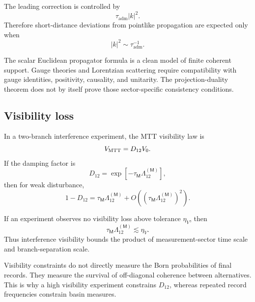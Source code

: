 \documentclass[11pt]{article}
\newcommand{\ta}{\tau_{\mathrm{adm}}}
\newcommand{\Meas}{\mathsf M}
\begin{document}
The leading correction is controlled by
\begin{equation}
  \ta |k|^2.
\end{equation}
Therefore short-distance deviations from pointlike propagation are expected only when
\begin{equation}
  |k|^2\sim \ta^{-1}.
\end{equation}

\begin{remark}
\label{rem:gauge-lorentzian-caution-phen}
The scalar Euclidean propagator formula is a clean model of finite coherent support. Gauge
theories and Lorentzian scattering require compatibility with gauge identities, positivity,
causality, and unitarity. The projection-duality theorem does not by itself prove those
sector-specific consistency conditions.
\end{remark}

\subsection{Visibility loss}
\label{subsec:visibility-loss-phen}

In a two-branch interference experiment, the MTT visibility law is
\begin{equation}
  V_{\rm MTT}
  =
  D_{12}V_0.
  \label{eq:phen-visibility}
\end{equation}
If the damping factor is
\begin{equation}
  D_{12}
  =
  \exp[-\tau_{\Meas}\Lambda_{12}^{(\Meas)}],
  \label{eq:phen-D}
\end{equation}
then for weak disturbance,
\begin{equation}
  1-D_{12}
  =
  \tau_{\Meas}\Lambda_{12}^{(\Meas)}
  +
  O\!\left((\tau_{\Meas}\Lambda_{12}^{(\Meas)})^2\right).
  \label{eq:phen-visibility-small}
\end{equation}

If an experiment observes no visibility loss above tolerance \(\eta_V\), then
\begin{equation}
  \tau_{\Meas}\Lambda_{12}^{(\Meas)}
  \lesssim
  \eta_V.
  \label{eq:phen-visibility-bound}
\end{equation}
Thus interference visibility bounds the product of measurement-sector time scale and
branch-separation scale.

\begin{remark}
\label{rem:visibility-constraints-measure}
Visibility constraints do not directly measure the Born probabilities of final records. They
measure the survival of off-diagonal coherence between alternatives. This is why a high
visibility experiment constrains \(D_{12}\), whereas repeated record frequencies constrain
basin measures.
\end{remark}
\end{document}
